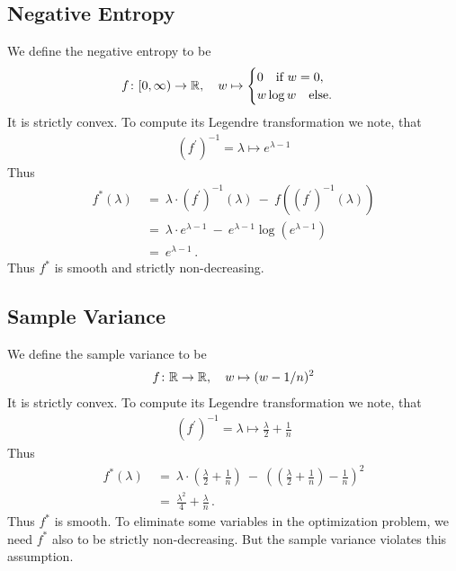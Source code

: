 \subsection*{Negative Entropy}
We define the negative entropy to be
\begin{gather}
  f
  \colon
  [0,\infty)
  \to
  \mathbb{R}
  ,\quad
  w
  \mapsto
  \begin{cases}
    0\quad\text{if}\ w=0,\\
    w\log w\quad
    \text{else}.
  \end{cases}
\end{gather}
It is strictly convex. To compute its Legendre transformation we note, that
\begin{gather}
  (f^{'})^{-1}
  =
  \lambda\mapsto
  e^{\lambda-1}
\end{gather}
Thus
  \begin{align*}
  f^*
  (\lambda)
  &
  \ 
  =
  \ 
  \lambda
    \cdot
    (f^{'})^{-1}(\lambda)
  \ 
    -
  \ 
    f
    \left( 
      (f^{'})^{-1}(\lambda)
    \right)
    \\
  &
  \ 
  =
  \ 
  \lambda
    \cdot
  e^{\lambda-1}
  \ 
    -
  \ 
  e^{\lambda-1}
  \log
  \left( 
  e^{\lambda-1}
  \right)
  \\
  &
  \ 
  =
  \ 
  e^{\lambda-1}
  \,.
  \end{align*}
  Thus $f^*$ is smooth and strictly non-decreasing.


  \subsection*{Sample Variance}
We define the sample variance to be
\begin{gather}
  f
  \colon
  \mathbb{R}
  \to
  \mathbb{R}
  ,\quad
  w
  \mapsto
  (w-1/n)^2
\end{gather}
It is strictly convex. To compute its Legendre transformation we note, that
\begin{gather}
  (f^{'})^{-1}
  =
  \lambda\mapsto
  \frac{\lambda}{2}
  +
  \frac{1}{n}
\end{gather}
Thus
  \begin{align*}
  f^*
  (\lambda)
  &
  \ 
  =
  \ 
  \lambda
    \cdot
    \left( 
  \frac{\lambda}{2}
  +
  \frac{1}{n}
    \right)
  \ 
    -
  \ 
    \left( 
    \left( 
  \frac{\lambda}{2}
  +
  \frac{1}{n}
    \right)
    -
    \frac{1}{n}
    \right)
    ^2
    \\
  &
  \ 
  =
  \ 
  \frac{\lambda^2}{4}
  +
  \frac{\lambda}{n}
  \,.
  \end{align*}
  Thus $f^*$ is smooth.
  To eliminate some variables in the optimization problem,
  we need $f^*$ also to be
  strictly non-decreasing. But the sample variance violates this assumption.

